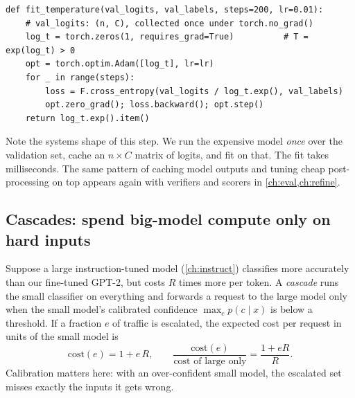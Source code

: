 \begin{lstlisting}[caption={Fitting a calibration temperature on cached validation logits.},label={lst:classify:temp}]
def fit_temperature(val_logits, val_labels, steps=200, lr=0.01):
    # val_logits: (n, C), collected once under torch.no_grad()
    log_t = torch.zeros(1, requires_grad=True)          # T = exp(log_t) > 0
    opt = torch.optim.Adam([log_t], lr=lr)
    for _ in range(steps):
        loss = F.cross_entropy(val_logits / log_t.exp(), val_labels)
        opt.zero_grad(); loss.backward(); opt.step()
    return log_t.exp().item()
\end{lstlisting}

Note the systems shape of this step. We run the expensive model \emph{once} over the
validation set, cache an $n\times C$ matrix of logits, and fit on that. The fit
takes milliseconds. The same pattern of caching model outputs and tuning cheap
post-processing on top appears again with verifiers and scorers in
\cref{ch:eval,ch:refine}.

\subsection{Cascades: spend big-model compute only on hard inputs}

Suppose a large instruction-tuned model (\cref{ch:instruct}) classifies more accurately
than our fine-tuned GPT-2, but costs $R$ times more per token. A \emph{cascade} runs the
small classifier on everything and forwards a request to the large model only when the
small model's calibrated confidence $\max_c p(c\mid x)$ is below a threshold. If a
fraction $e$ of traffic is escalated, the expected cost per request in units of the
small model is
\begin{equation}
\text{cost}(e) = 1 + e\,R,\qquad \frac{\text{cost}(e)}{\text{cost of large only}} = \frac{1+eR}{R}.
\label{eq:classify:cascade}
\end{equation}
Calibration matters here: with an over-confident small model, the escalated set misses
exactly the inputs it gets wrong.

